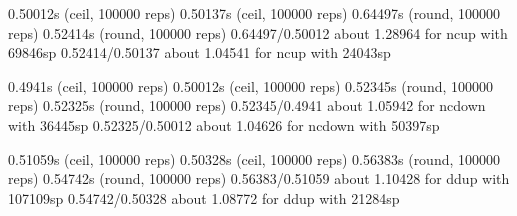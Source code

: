 0.50012s (ceil, 100000 reps)                            0.50137s (ceil, 100000 reps)                           
0.64497s (round, 100000 reps)                           0.52414s (round, 100000 reps)                          
0.64497/0.50012 about 1.28964 for ncup with 69846sp     0.52414/0.50137 about 1.04541 for ncup with 24043sp    
                                                                                                               
0.4941s (ceil, 100000 reps)                             0.50012s (ceil, 100000 reps)                           
0.52345s (round, 100000 reps)                           0.52325s (round, 100000 reps)                          
0.52345/0.4941 about 1.05942 for ncdown with 36445sp    0.52325/0.50012 about 1.04626 for ncdown with 50397sp  
                                                                                                               
0.51059s (ceil, 100000 reps)                            0.50328s (ceil, 100000 reps)                           
0.56383s (round, 100000 reps)                           0.54742s (round, 100000 reps)                          
0.56383/0.51059 about 1.10428 for ddup with 107109sp    0.54742/0.50328 about 1.08772 for ddup with 21284sp    
                                                                                                               
